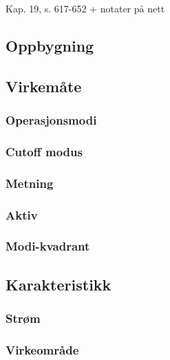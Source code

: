 Kap. 19, s. 617-652
+ notater på nett

\subsection{Oppbygning}


\subsection{Virkemåte}
  \subsubsection{Operasjonsmodi}
    
  \subsubsection{Cutoff modus}
    
  \subsubsection{Metning}
    
  \subsubsection{Aktiv}
    
  \subsubsection{Modi-kvadrant}
    

\subsection{Karakteristikk}
  \subsubsection{Strøm}
    
  \subsubsection{Virkeområde}
    
